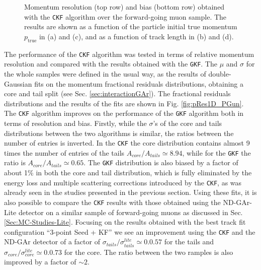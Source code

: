 \begin{figure}[t]
        \caption[Momentum resolution and bias obtained with the \texttt{CKF} algorithm over the forward-going muon sample as a function of some key quantities.]{Momentum resolution (top row) and bias (bottom row) obtained with the \texttt{CKF} algorithm over the forward-going muon sample. The results are shown as a function of the particle initial true momentum $p_\text{true}$ in (a) and (c), and as a function of track length in (b) and (d).}
        \label{fig:pRes2D_PGun}
\end{figure}

The performance of the \texttt{CKF} algorithm was tested in terms of relative momentum resolution and compared with the results obtained with the \texttt{GKF}. The $\mu$ and $\sigma$ for the whole samples were defined in the usual way, as the results of double-Gaussian fits on the momentum fractional residuals distributions, obtaining a core and tail split (see Sec. \ref{sec:interactionGAr}). The fractional residuals distributions and the results of the fits are shown in Fig. \ref{fig:pRes1D_PGun}. The \texttt{CKF} algorithm improves on the performance of the \texttt{GKF} algorithm both in terms of resolution and bias. Firstly, while the $\sigma$'s of the core and tails distributions between the two algorithms is similar, the ratios between the number of entries is inverted. In the \texttt{CKF}  the core distribution contains almost 9 times the number of entries of the tails $A_{core}/A_{tails}\simeq 8.94$, while for the \texttt{GKF} the ratio is $A_{core}/A_{tails}\simeq 0.65$. The \texttt{GKF} distribution is also biased by a factor of about 1\% in both the core and tail distribution, which is fully eliminated by the energy loss and multiple scattering corrections introduced by the \texttt{CKF}, as was already seen in the studies presented in the previous section. Using these fits, it is also possible to compare the \texttt{CKF} results with those obtained using the ND-GAr-Lite detector on a similar sample of forward-going muons as discussed in Sec. \ref{Sec:MC-Studies-Lite}. Focusing on the results obtained with the best track fit configuration \enquote{3-point Seed + KF} we see an improvement using the \texttt{CKF} and the ND-GAr detector of a factor of  $\sigma_{tails}/\sigma_{tails}^{lite}\simeq0.0.57$ for the tails and $\sigma_{core}/\sigma_{core}^{lite}\simeq0.0.73$ for the core. The ratio between the two ramples is also improved by a factor of $\sim 2$.

